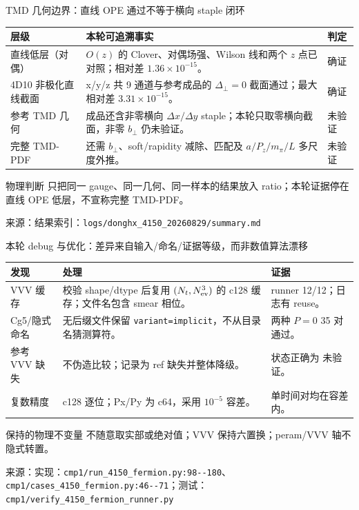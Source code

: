 \documentclass[UTF8,aspectratio=169,11pt]{ctexbeamer}
\newcommand{\source}[1]{\vspace{0.05em}\par{\raggedright\scriptsize\color{muted}来源：#1\par}}
\newcommand{\codepath}[1]{\nolinkurl{#1}}
\newcommand{\verified}{\textcolor{evidence}{确证}}
\newcommand{\unverified}{\textcolor{warning}{未验证}}
\begin{document}
\begin{frame}[t]{TMD 几何边界：直线 OPE 通过不等于横向 staple 闭环}
  \footnotesize
  \begin{tabularx}{0.96\textwidth}{@{}L Y Y@{}}
    \toprule
    层级 & 本轮可追溯事实 & 判定\\
    \midrule
    直线低层（对偶） & $O(z)$ 的 Clover、对偶场强、Wilson 线和两个 $z$ 点已对照；相对差 $1.36\times10^{-15}$。 & \verified\\
    4D10 非极化直线截面 & x/y/z 共 9 通道与参考成品的 $\Delta_\perp=0$ 截面通过；最大相对差 $3.31\times10^{-15}$。 & \verified\\
    参考 TMD 几何 & 成品还含非零横向 $\Delta x/\Delta y$ staple；本轮只取零横向截面，非零 $b_\perp$ 仍未验证。 & \unverified\\
    完整 TMD-PDF & 还需 $b_\perp$、soft/rapidity 减除、匹配及 $a/P_z/m_\pi/L$ 多尺度外推。 & \unverified\\
    \bottomrule
  \end{tabularx}
  \begin{block}{物理判断}
    只把同一 gauge、同一几何、同一样本的结果放入 ratio；本轮证据停在直线 OPE 低层，不宣称完整 TMD-PDF。
  \end{block}
  \source{结果索引：\codepath{logs/donghx_4150_20260829/summary.md}}
\end{frame}

\begin{frame}[t]{本轮 debug 与优化：差异来自输入/命名/证据等级，而非数值算法漂移}
  \footnotesize
  \renewcommand{\arraystretch}{1.00}
  \begin{tabularx}{0.96\textwidth}{@{}L Y Y@{}}
    \toprule
    发现 & 处理 & 证据\\
    \midrule
    VVV 缓存 & 校验 shape/dtype 后复用 $(N_t,N_{\rm ev}^3)$ 的 c128 缓存；文件名包含 smear 相位。 & runner 12/12；日志有 reuse。\\
    Cg5/隐式命名 & 无后缀文件保留 \codepath{variant=implicit}，不从目录名猜测算符。 & 两种 $P=0$ 35 对通过。\\
    参考 VVV 缺失 & 不伪造比较；记录为 ref 缺失并整体降级。 & 状态正确为 \unverified。\\
    复数精度 & c128 逐位；Px/Py 为 c64，采用 $10^{-5}$ 容差。 & 单时间对均在容差内。\\
    \bottomrule
  \end{tabularx}
  \begin{block}{保持的物理不变量}
    不随意取实部或绝对值；VVV 保持六置换；peram/VVV 轴不隐式转置。
  \end{block}
  \source{实现：\codepath{cmp1/run_4150_fermion.py:98--180}、\codepath{cmp1/cases_4150_fermion.py:46--71}；测试：\codepath{cmp1/verify_4150_fermion_runner.py}}
\end{frame}
\end{document}
